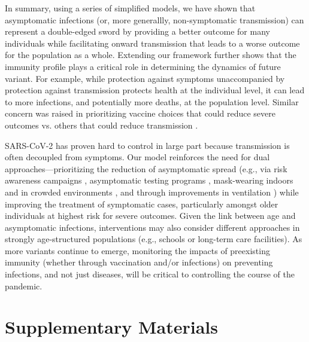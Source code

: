\documentclass[12pt]{article}
\begin{document}
In summary, using a series of simplified models, we have shown that asymptomatic infections (or, more generallly, non-symptomatic transmission) can represent a double-edged sword by providing a better outcome for many individuals while facilitating onward transmission that leads to a worse outcome for the population as a whole.
Extending our framework further shows that the immunity profile plays a critical role in determining the dynamics of future variant. 
For example, while protection against symptoms unaccompanied by protection against transmission protects health at the individual level, it can lead to more infections, and potentially more deaths, at the population level.
Similar concern was raised in prioritizing vaccine choices that could reduce severe outcomes vs. others that could reduce transmission \citep{koelle2022changing}.

SARS-CoV-2 has proven hard to control in large part because transmission is often decoupled from symptoms. 
Our model reinforces the need for dual approaches---prioritizing the reduction of asymptomatic spread (e.g., via risk awareness campaigns \citep{chande2020real,sinclair2021pairing}, asymptomatic testing programs \citep{mina2021covid,gibson2022surv}, mask-wearing indoors and in crowded environments \citep{jones2020two,prather2020reducing,howard2021ev}, and through improvements in ventilation \citep{allen2021indoor,wang2021airborne}) while improving the treatment of symptomatic cases, particularly amongst older individuals at highest risk for severe outcomes. 
Given the link between age and asymptomatic infections, interventions may also consider different approaches in strongly age-structured populations (e.g., schools or long-term care facilities).
As more variants continue to emerge, monitoring the impacts of preexisting immunity (whether through vaccination and/or infections) on preventing infections, and not just diseases, will be critical to controlling the course of the pandemic.

\pagebreak

\section*{Supplementary Materials}
\setcounter{figure}{0}
\renewcommand{\thefigure}{S\arabic{figure}}
\end{document}
